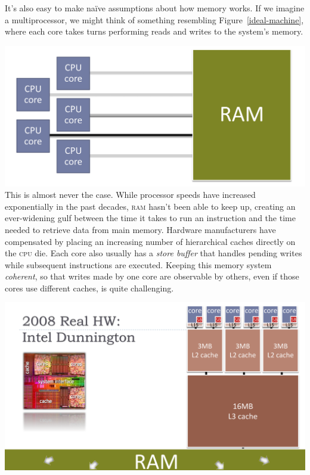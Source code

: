 \documentclass[fontsize=10pt, numbers=endperiod]{scrartcl}
\newcommand{\fig}[1]{Figure~\ref{#1}}
\newcommand{\introduce}[1]{\textit{#1}}
\newenvironment{colfigure}
  {\par\vspace{1\baselineskip minus 0.5\baselineskip}\noindent\minipage{\linewidth}}
  {\endminipage\vspace*{1\baselineskip minus 0.7\baselineskip}}
\begin{document}
\begin{multicols*}{2}
It's also easy to make naïve assumptions about how memory works.
If we imagine a multiprocessor,
we might think of something resembling \fig{ideal-machine},
where each core takes turns performing reads and writes to the system's memory.
\begin{colfigure}
\centering
\includegraphics[keepaspectratio, width=0.8\linewidth]{ideal-machine}
\label{ideal-machine}
\end{colfigure}
This is almost never the case.
While processor speeds have increased exponentially in the past decades,
\textsc{ram} hasn't been able to keep up,
creating an ever-widening gulf between the time it takes to run an
instruction and the time needed to retrieve data from main memory.
Hardware manufacturers have compensated by placing an increasing number of
hierarchical caches directly on the \textsc{cpu} die.
Each core also usually has a \introduce{store buffer} that handles
pending writes while subsequent instructions are executed.
Keeping this memory system \introduce{coherent},
so that writes made by one core are observable by others,
even if those cores use different caches,
is quite challenging.

\begin{colfigure}
\centering
\includegraphics[keepaspectratio, width=\linewidth]{actual-machine}
\label{dunnington}
\end{colfigure}


\end{multicols*}
\end{document}
